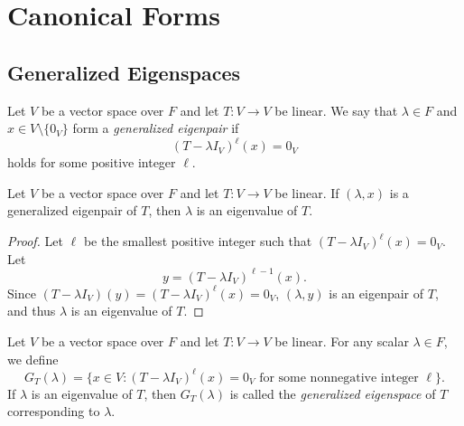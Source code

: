 \chapter{Canonical Forms}
\section{Generalized Eigenspaces}
\begin{definition}
  Let $V$ be a vector space over $F$ and let $T: V \to V$ be linear.
  We say that $\lambda \in F$ and $x \in V \setminus \{0_V\}$ form a
  \emph{generalized eigenpair} if
  \begin{equation*}
    (T - \lambda I_V)^\ell(x) = 0_V
  \end{equation*}
  holds for some positive integer $\ell$.
\end{definition}

\begin{theorem}
  Let $V$ be a vector space over $F$ and let $T: V \to V$ be linear.
  If $(\lambda, x)$ is a generalized eigenpair of $T$, then $\lambda$ is an
  eigenvalue of $T$.
\end{theorem}
\begin{proof}
  Let $\ell$ be the smallest positive integer such that 
  $(T - \lambda I_V)^\ell(x) = 0_V$.
  Let
  \begin{equation*}
    y = (T - \lambda I_V)^{\ell-1}(x).
  \end{equation*}
  Since $(T - \lambda I_V)(y) = (T - \lambda I_V)^\ell(x) = 0_V$,
  $(\lambda, y)$ is an eigenpair of $T$, and thus $\lambda$ is an eigenvalue of
  $T$.
\end{proof}

\begin{definition}
  Let $V$ be a vector space over $F$ and let $T: V \to V$ be linear.
  For any scalar $\lambda \in F$, we define
  \begin{equation*}
    G_T(\lambda) = \{x \in V : \text{$(T - \lambda I_V)^\ell(x) = 0_V$ for some
    nonnegative integer $\ell$}\}.
  \end{equation*}
  If $\lambda$ is an eigenvalue of $T$, then $G_T(\lambda)$ is called the
  \emph{generalized eigenspace} of $T$ corresponding to $\lambda$.
\end{definition}

